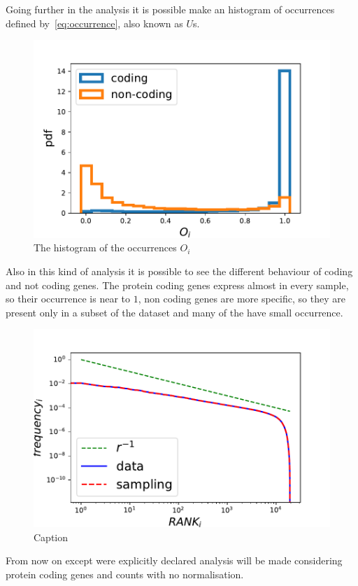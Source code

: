 Going further in the analysis it is possible make an histogram of occurrences defined by~\ref{eq:occurrence}, also known as $U$s.
\begin{figure}[htb!]
    \centering
    \includegraphics[width=0.9\linewidth]{pictures/structure/gtex/U_gtex_cnc.pdf}
    \caption{The histogram of the occurrences $O_i$}
    \label{fig:structure/gtex/U_cnc}
\end{figure}

Also in this kind of analysis it is possible to see the different behaviour of coding and not coding genes. The protein coding genes express almost in every sample, so their occurrence is near to $1$, non coding genes are more specific, so they are present only in a subset of the dataset and many of the have small occurrence.

\begin{figure}
    \centering
    \begin{minipage}{0.45\textwidth}
    \includegraphics{pictures/structure/tcga/globalzipf_null.pdf}
    \end{minipage}
    \hspace{2mm}
    \begin{minipage}{0.45\textwidth}
    
    \end{minipage}
    \caption{Caption}
    \label{fig:my_label}
\end{figure}

From now on except were explicitly declared analysis will be made considering protein coding genes and counts with no normalisation.
